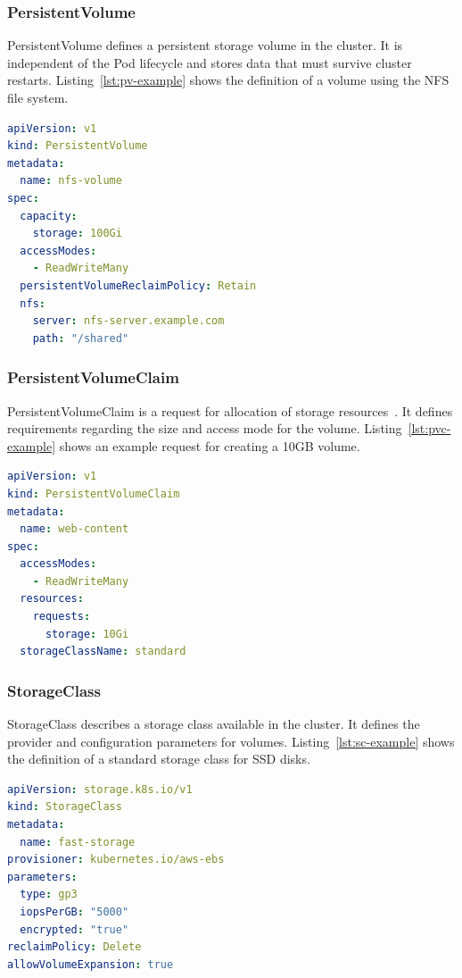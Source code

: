 \subsubsection{PersistentVolume}
PersistentVolume defines a persistent storage volume in the cluster.
It is independent of the Pod lifecycle and stores data that must survive cluster restarts.
Listing~\ref{lst:pv-example} shows the definition of a volume using the NFS file system.

\begin{lstlisting}[language=yaml,caption={Example PersistentVolume definition},label={lst:pv-example}]
apiVersion: v1
kind: PersistentVolume
metadata:
  name: nfs-volume
spec:
  capacity:
    storage: 100Gi
  accessModes:
    - ReadWriteMany
  persistentVolumeReclaimPolicy: Retain
  nfs:
    server: nfs-server.example.com
    path: "/shared"
\end{lstlisting}

\subsubsection{PersistentVolumeClaim}
PersistentVolumeClaim is a request for allocation of storage resources~\cite{k8s_persistent_volumes}.
It defines requirements regarding the size and access mode for the volume.
Listing~\ref{lst:pvc-example} shows an example request for creating a 10GB volume.

\begin{lstlisting}[language=yaml,caption={Example PersistentVolumeClaim definition},label={lst:pvc-example}]
apiVersion: v1
kind: PersistentVolumeClaim
metadata:
  name: web-content
spec:
  accessModes:
    - ReadWriteMany
  resources:
    requests:
      storage: 10Gi
  storageClassName: standard
\end{lstlisting}

\subsubsection{StorageClass}
StorageClass describes a storage class available in the cluster.
It defines the provider and configuration parameters for volumes.
Listing~\ref{lst:sc-example} shows the definition of a standard storage class for SSD disks.

\begin{lstlisting}[language=yaml,caption={Example StorageClass definition},label={lst:sc-example}]
apiVersion: storage.k8s.io/v1
kind: StorageClass
metadata:
  name: fast-storage
provisioner: kubernetes.io/aws-ebs
parameters:
  type: gp3
  iopsPerGB: "5000"
  encrypted: "true"
reclaimPolicy: Delete
allowVolumeExpansion: true
\end{lstlisting}

